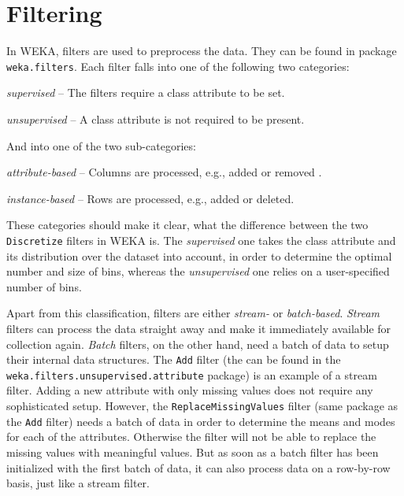 \section{Filtering}
\label{api_filtering}
In WEKA, filters are used to preprocess the data. They can be found in
package \texttt{weka.filters}. Each filter falls into one
of the following two categories:
\begin{tight_itemize}
	\item \textit{supervised} -- The filters require a class attribute to be
set.
	\item \textit{unsupervised} -- A class attribute is not required to be
present.
\end{tight_itemize}
And into one of the two sub-categories:
\begin{tight_itemize}
	\item \textit{attribute-based} -- Columns are processed, e.g., added or
removed .
	\item \textit{instance-based} -- Rows are processed, e.g., added or deleted.
\end{tight_itemize}
These categories should make it clear, what the difference between the two
\texttt{Discretize} filters in WEKA is. The \textit{supervised} one takes the
class attribute and its distribution over the dataset into account, in order to
determine the optimal number and size of bins, whereas the
\textit{unsupervised} one relies on a user-specified number of bins.

Apart from this classification, filters are either \textit{stream-} or
\textit{batch-based}. \textit{Stream} filters can process the data straight away
and make it immediately available for collection again. \textit{Batch} filters,
on the other hand, need a batch of data to setup their internal
data structures. The \texttt{Add} filter (the can be found in the
\texttt{weka.filters.unsupervised.attribute} package) is an example of a stream
filter. Adding a new attribute with only missing values does not require any
sophisticated setup. However, the \texttt{ReplaceMissingValues} filter (same
package as the \texttt{Add} filter) needs a batch of data in order to determine
the means and modes for each of the attributes. Otherwise the filter will not
be able to replace the missing values with meaningful values. But as soon as a
batch filter has been initialized with the first batch of data, it can also
process data on a row-by-row basis, just like a stream filter.

